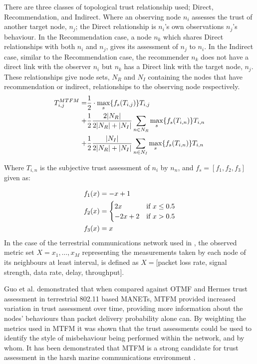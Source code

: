 \documentclass{aamas2016}
\begin{document}
There are three classes of topological trust relationship used; Direct, Recommendation, and Indirect.
Where an observing node $n_i$ assesses the trust of another target node, $n_j$; the Direct relationship is $n_i$'s own observations $n_j$'s behaviour.
In the Recommendation case, a node $n_k$ which shares Direct relationships with both $n_i$ and $n_j$, gives its assessment of $n_j$ to $n_i$.
In the Indirect case, similar to the Recommendation case, the recommender $n_k$ does not have a direct link with the observer $n_i$ but $n_k$ has a Direct link with the target node, $n_j$.
These relationships give node sets, $N_R$ and $N_I$ containing the nodes that have recommendation or indirect, relationships to the observing node respectively.
%
\begin{align}
\label{eq:networkeffects}
T_{i,j}^{MTFM}=&\frac{1}{2} \cdot \max_s\{f_s(T_{i,j})\} T_{i,j}\\ \notag
+&\frac{1}{2} \frac{2|N_R| }{2|N_R| + |N_I|}\sum_{n \in N_R} \max_s\{f_s(T_{i,n})\} T_{i,n}\\ \notag
+&\frac{1}{2} \frac{|N_I| }{2|N_R| + |N_I|}\sum_{n \in N_I} \max_s\{f_s(T_{i,n})\} T_{i,n} 
\end{align}

Where $T_{i,n}$ is the subjective trust assessment of $n_i$ by $n_n$, and $f_s = [ f_1,f_2, f_3]$ given as:

\begin{align}
\label{eq:whitenization}
f_1(x)&= -x+1\notag\\
f_2(x)&= 
\begin{cases}
2x & \text{if }x\leq 0.5\\
-2x+2 & \text{if }x>0.5
\end{cases}\\
f_3(x)&= x\notag
\end{align}
%
In the case of the terrestrial communications network used in \cite{Guo11}, the observed metric set $X = {x_1,\dots,x_M}$ representing the measurements taken by each node of its neighbours at least interval, is defined as $X=[$packet loss rate, signal strength, data rate, delay, throughput$]$.

Guo et al. demonstrated that when compared against OTMF and Hermes trust assessment in terrestrial 802.11 based MANETs, MTFM provided increased variation in trust assessment over time, providing more information about the nodes' behaviours than packet delivery probability alone can.
By weighting the metrics used in MTFM it was shown that the trust assessments could be used to identify the style of misbehaviour being performed within the network, and by whom.
It has been demonstrated that MTFM is a strong candidate for trust assessment in the harsh marine communications environment \cite{Bolster2015}.
\end{document}
